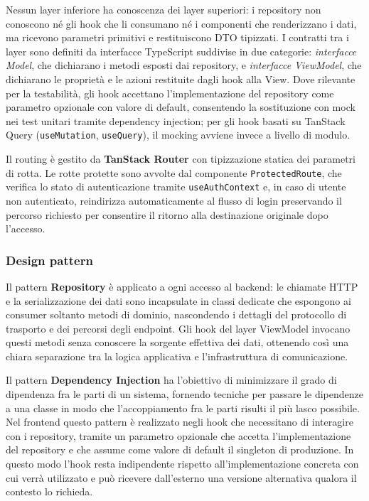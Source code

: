 \documentclass[a4paper, 11pt]{article}
\newcounter{subsubsubsection}[subsubsection]
\begin{document}
\newline
\newline
Nessun layer inferiore ha conoscenza dei layer superiori: i repository non conoscono né gli hook che li consumano né i componenti che renderizzano i dati, ma ricevono parametri primitivi e restituiscono DTO tipizzati. I contratti tra i layer sono definiti da interfacce TypeScript suddivise in due categorie: \textit{interfacce Model}, che dichiarano i metodi esposti dai repository, e \textit{interfacce ViewModel}, che dichiarano le proprietà e le azioni restituite dagli hook alla View. Dove rilevante per la testabilità, gli hook accettano l'implementazione del repository come parametro opzionale con valore di default, consentendo la sostituzione con mock nei test unitari tramite dependency injection; per gli hook basati su TanStack Query (\texttt{useMutation}, \texttt{useQuery}), il mocking avviene invece a livello di modulo.

Il routing è gestito da \textbf{TanStack Router} con tipizzazione statica dei parametri di rotta. Le rotte protette sono avvolte dal componente \texttt{ProtectedRoute}, che verifica lo stato di autenticazione tramite \texttt{useAuthContext} e, in caso di utente non autenticato, reindirizza automaticamente al flusso di login preservando il percorso richiesto per consentire il ritorno alla destinazione originale dopo l'accesso.

\subsubsection{Design pattern}




Il pattern \textbf{Repository} è applicato a ogni accesso al backend: le chiamate HTTP e la serializzazione dei dati sono incapsulate in classi dedicate che espongono ai consumer soltanto metodi di dominio, nascondendo i dettagli del protocollo di trasporto e dei percorsi degli endpoint. Gli hook del layer ViewModel invocano questi metodi senza conoscere la sorgente effettiva dei dati, ottenendo così una chiara separazione tra la logica applicativa e l'infrastruttura di comunicazione.


Il pattern \textbf{Dependency Injection} ha l'obiettivo di minimizzare il grado di dipendenza fra le parti di un sistema, fornendo tecniche per passare le dipendenze a una classe in modo che l'accoppiamento fra le parti risulti il più lasco possibile. Nel frontend questo pattern è realizzato negli hook che necessitano di interagire con i repository, tramite un parametro opzionale che accetta l'implementazione del repository e che assume come valore di default il singleton di produzione. In questo modo l'hook resta indipendente rispetto all'implementazione concreta con cui verrà utilizzato e può ricevere dall'esterno una versione alternativa qualora il contesto lo richieda.
\end{document}
